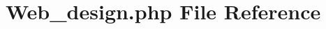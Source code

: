 \hypertarget{_web__design_8php}{}\section{Web\+\_\+design.\+php File Reference}
\label{_web__design_8php}
